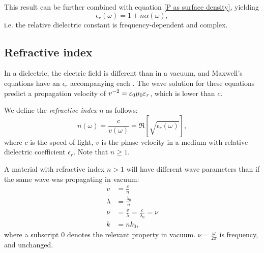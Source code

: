     This result can be further combined with equation \eqref{P as surface density}, yielding
    \begin{equation}
        \epsilon_r(\omega) = 1 + n\alpha(\omega),
    \end{equation}
    i.e. the relative dielectric constant is frequency-dependent and complex. 

\subsection{Refractive index}

    In a dielectric, the electric field is different than in a vacuum, and Maxwell's equations have an $\epsilon_r$ accompanying each \e. 
    The wave solution for these equations predict a propagation velocity of $v^{-2} = \varepsilon_0\mu_0\varepsilon_r$, which is lower than $c$. 
    
    We define the \textit{refractive index} $n$ as follows: 
    \begin{equation}
        n(\omega) = \frac{c}{v(\omega)} = \Re\left[\sqrt{\epsilon_r(\omega)}\right],
    \end{equation}
    where $c$ is the speed of light, $v$ is the phase velocity
    in a medium with relative dielectric coefficient $\epsilon_r$. Note that $n \geq 1$.

    A material with refractive index $n > 1$ will have different wave parameters than if the same wave was propagating in vacuum: 
    \begin{align*}
        v &= \frac{c}{n} \\
        \lambda &= \frac{\lambda_0}{n} \\
        \nu &= \frac{v}{\lambda} = \frac{c}{\lambda_0} = \nu \\
        k &= nk_0,
    \end{align*}
    where a subscript $0$ denotes the relevant property in vacuum. $\nu = \frac{\omega}{2\pi}$ is frequency, and unchanged.


